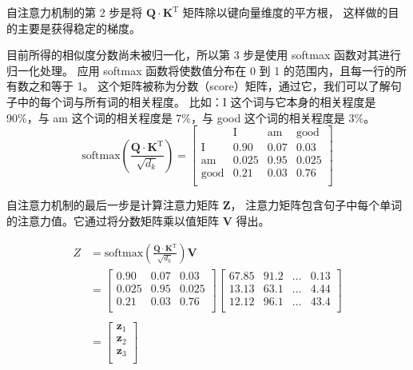 自注意力机制的第 2 步是将 $\boldsymbol{Q} \cdot \boldsymbol{K}^\mathrm{T}$ 矩阵除以键向量维度的平方根，
这样做的目的主要是获得稳定的梯度。

目前所得的相似度分数尚未被归一化，所以第 3 步是使用 softmax 函数对其进行归一化处理。
应用 softmax 函数将使数值分布在 0 到 1 的范围内，且每一行的所有数之和等于 1。
这个矩阵被称为分数（score）矩阵，通过它，我们可以了解句子中的每个词与所有词的相关程度。
比如：I 这个词与它本身的相关程度是 90\%，与 am 这个词的相关程度是 7\%，与 good 这个词的相关程度是 3\%。
$$
	\text{softmax}\left(\frac{\boldsymbol{Q} \cdot \boldsymbol{K}^\mathrm{T}}{\sqrt{d_k}}\right) =
	\begin{bmatrix}
		            & \text{I} & \text{am} & \text{good} \\
		\text{I}    & 0.90     & 0.07      & 0.03        \\
		\text{am}   & 0.025    & 0.95      & 0.025       \\
		\text{good} & 0.21     & 0.03      & 0.76        \\
	\end{bmatrix}
$$

自注意力机制的最后一步是计算注意力矩阵 $\boldsymbol{Z}$，
注意力矩阵包含句子中每个单词的注意力值。它通过将分数矩阵乘以值矩阵 $\boldsymbol{V}$ 得出。

\begin{align*}
	Z & = \text{softmax}\left(\frac{\boldsymbol{Q} \cdot \boldsymbol{K}^\mathrm{T}}{\sqrt{d_k}}\right) \boldsymbol{V} \\
	  & =
	\begin{bmatrix}
		0.90  & 0.07 & 0.03  \\
		0.025 & 0.95 & 0.025 \\
		0.21  & 0.03 & 0.76  \\
	\end{bmatrix}
	\begin{bmatrix}
		67.85 & 91.2 & \ldots & 0.13 \\
		13.13 & 63.1 & \ldots & 4.44 \\
		12.12 & 96.1 & \ldots & 43.4 \\
	\end{bmatrix}                                                                                      \\                                                                                              \\
	  & =
	\begin{bmatrix}
		\boldsymbol{z}_1 \\
		\boldsymbol{z}_2 \\
		\boldsymbol{z}_3 \\
	\end{bmatrix}
\end{align*}

